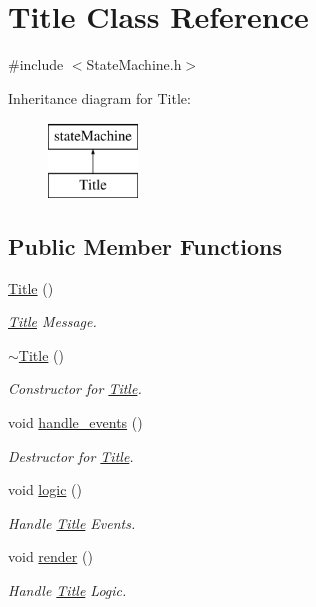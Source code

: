 \hypertarget{class_title}{\section{Title Class Reference}
\label{class_title}
}


{\ttfamily \#include $<$State\-Machine.\-h$>$}

Inheritance diagram for Title\-:\begin{figure}[H]
\begin{center}
\leavevmode
\includegraphics[height=2.000000cm]{class_title}
\end{center}
\end{figure}
\subsection*{Public Member Functions}
\begin{DoxyCompactItemize}
\item 
\hyperlink{class_title_a56ca0b368a213295649d75c62577e4bb}{Title} ()
\begin{DoxyCompactList}\small\item\em \hyperlink{class_title}{Title} Message. \end{DoxyCompactList}\item 
\hyperlink{class_title_aa0423651e6010e406b1c1052724b785c}{$\sim$\-Title} ()
\begin{DoxyCompactList}\small\item\em Constructor for \hyperlink{class_title}{Title}. \end{DoxyCompactList}\item 
void \hyperlink{class_title_a679fe0df9fda9088027619dc1bed3780}{handle\-\_\-events} ()
\begin{DoxyCompactList}\small\item\em Destructor for \hyperlink{class_title}{Title}. \end{DoxyCompactList}\item 
void \hyperlink{class_title_a530e17f16f634a0385a8d37ed6a57104}{logic} ()
\begin{DoxyCompactList}\small\item\em Handle \hyperlink{class_title}{Title} Events. \end{DoxyCompactList}\item 
void \hyperlink{class_title_a4a9fe899fdb92d6d82bbb88b949cdeaf}{render} ()
\begin{DoxyCompactList}\small\item\em Handle \hyperlink{class_title}{Title} Logic. \end{DoxyCompactList}\end{DoxyCompactItemize}


